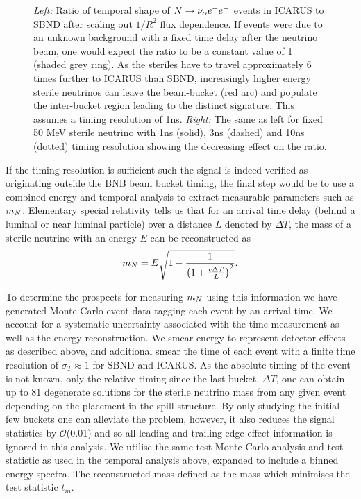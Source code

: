 \documentclass[11pt, a4paper]{article}
\def\ster{\ensuremath N}
\begin{document}
\begin{figure}[t]
\begin{subfigure}[t]{0.5\textwidth}
\end{subfigure}
\caption{\label{fig:icarus_the_great}
\emph{Left: }Ratio of temporal shape of $\ster \rightarrow \nu_\alpha e^+ e^-$ events in ICARUS to SBND after scaling out $1/R^2$ flux dependence. If events were due to an unknown background with a fixed time delay after the neutrino beam, one would expect the ratio to be a constant value of 1 (shaded grey ring). As the steriles have to travel approximately 6 times further to ICARUS than SBND, increasingly higher energy sterile neutrinos can leave the beam-bucket (red arc) and populate the inter-bucket region leading to the distinct signature. This assumes a timing resolution of 1ns. \emph{Right: } The same as left for fixed 50 MeV sterile neutrino with 1ns (solid), 3ns (dashed) and 10ns (dotted) timing resolution showing the decreasing effect on the ratio.   }

\end{figure}

If the timing resolution is sufficient such the signal is indeed verified as
originating outside the BNB beam bucket timing, the final step would be to use
a combined energy and temporal analysis to extract measurable parameters such
as $m_\ster$. Elementary special relativity tells us that for an arrival time delay (behind a
luminal or near luminal particle) over a distance $L$ denoted by $\Delta T$,
the mass of a sterile neutrino with an energy $E$ can be reconstructed as 
%
\[ m_{\ster} = E\sqrt{1-\frac{1}{\left(1+\frac{c\Delta T}{L}\right)^2}}. \]

To determine the prospects for measuring $m_{\ster}$ using this information we
have generated Monte Carlo event data tagging each event by an arrival time.
We account for a systematic uncertainty associated with the time measurement as
well as the energy reconstruction. We smear energy to represent detector
effects as described above, and additional smear the time of each event with a
finite time resolution of $\sigma_T  \approx 1$ for SBND and ICARUS. As the
absolute timing of the event is not known, only the relative timing since the
last bucket, $\Delta T$, one can obtain up to 81 degenerate solutions for the
sterile neutrino mass from any given event depending on the placement in the spill
structure. By only studying the initial few buckets one can alleviate the
problem, however, it also reduces the signal statistics by $\mathcal{O}$(0.01)
and so all leading and trailing edge effect information is ignored in this analysis.
We utilise the same test Monte Carlo analysis and test statistic as used in the temporal analysis
above, expanded to include a binned energy spectra. The reconstructed mass defined
as the mass which minimises the test statistic $t_m$. 
\end{document}
